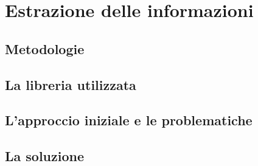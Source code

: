 \chapter{Estrazione delle informazioni}
\section{Metodologie}
\section{La libreria utilizzata}
\section{L'approccio iniziale e le problematiche}
\section{La soluzione}